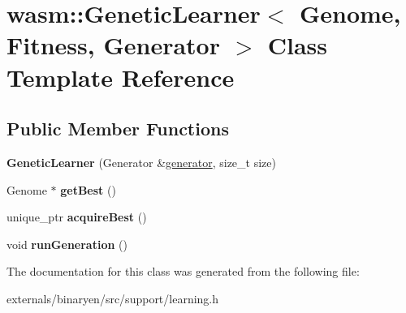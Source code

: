 \hypertarget{classwasm_1_1_genetic_learner}{}\section{wasm\+:\+:Genetic\+Learner$<$ Genome, Fitness, Generator $>$ Class Template Reference}
\label{classwasm_1_1_genetic_learner}
\subsection*{Public Member Functions}
\begin{DoxyCompactItemize}
\item 
\mbox{\label{classwasm_1_1_genetic_learner_adf36837472631257f59195259fad18b7}} 
{\bfseries Genetic\+Learner} (Generator \&\mbox{\hyperlink{structgenerator}{generator}}, size\+\_\+t size)
\item 
\mbox{\label{classwasm_1_1_genetic_learner_a38cfb65aad18a50e81c188fa3eefd925}} 
Genome $\ast$ {\bfseries get\+Best} ()
\item 
\mbox{\label{classwasm_1_1_genetic_learner_ac0a448827c50c24f2af54562051d279d}} 
unique\+\_\+ptr {\bfseries acquire\+Best} ()
\item 
\mbox{\label{classwasm_1_1_genetic_learner_a482b33a6599329302cd6c45d7100bd55}} 
void {\bfseries run\+Generation} ()
\end{DoxyCompactItemize}


The documentation for this class was generated from the following file\+:\begin{DoxyCompactItemize}
\item 
externals/binaryen/src/support/learning.\+h\end{DoxyCompactItemize}
